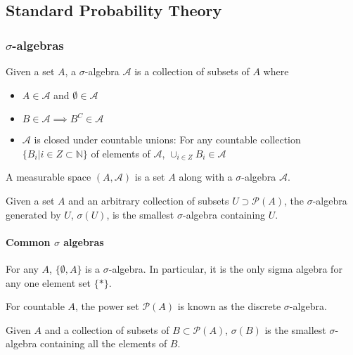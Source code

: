 \subsection{Standard Probability Theory}\label{sec:standard_prob}

\subsubsection{$\sigma$-algebras}

\begin{definition}
Given a set $A$, a $\sigma$-algebra $\mathcal{A}$ is a collection of subsets of $A$ where
\begin{itemize}
	\item $A\in \mathcal{A}$ and $\emptyset\in \mathcal{A}$
	\item $B\in \mathcal{A}\implies B^C\in\mathcal{A}$
	\item $\mathcal{A}$ is closed under countable unions: For any countable collection $\{B_i|i\in Z\subset \mathbb{N}\}$ of elements of $\mathcal{A}$, $\cup_{i\in Z}B_i\in \mathcal{A}$ 
\end{itemize}
\end{definition}

\begin{definition}
A measurable space $(A,\mathcal{A})$ is a set $A$ along with a $\sigma$-algebra $\mathcal{A}$.
\end{definition}

\begin{definition}
Given a set $A$ and an arbitrary collection of subsets $U\supset\mathscr{P}(A)$, the $\sigma$-algebra generated by $U$, $\sigma(U)$, is the smallest $\sigma$-algebra containing $U$.
\end{definition}

\paragraph{Common $\sigma$ algebras}

For any $A$, $\{\emptyset,A\}$ is a $\sigma$-algebra. In particular, it is the only sigma algebra for any one element set $\{*\}$.

For countable $A$, the power set $\mathscr{P}(A)$ is known as the discrete $\sigma$-algebra.

Given $A$ and a collection of subsets of $B\subset\mathscr{P}(A)$, $\sigma(B)$ is the smallest $\sigma$-algebra containing all the elements of $B$. 

